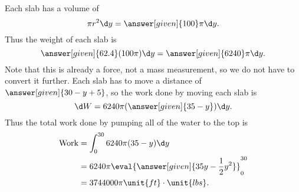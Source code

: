 \documentclass{ximera}
\begin{document}
\begin{example}
\begin{explanation}
\begin{image}
    \end{image}
    Each slab has a volume of
    \[
    \pi r^2 \d y = \answer[given]{100}\pi\d y.
    \]
    Thus the weight of each slab is
    \[
    \answer[given]{62.4}(100\pi)\d y = \answer[given]{6240}\pi \d y.
    \]
    Note that this is already a force, not a mass measurement, so we
    do not have to convert it further.  Each slab has to move a
    distance of $\answer[given]{30-y +5}$, so the work done by moving
    each slab is
    \[
    \d W = 6240 \pi (\answer[given]{35-y}) \d y.
    \]
    Thus the total work done by pumping all of the water to the top is
    \begin{align*}
      \mathrm{Work} &= \int_0^{30} 6240 \pi (35-y) \d y\\
      &= 6240 \pi \eval{\answer[given]{35y-\frac{1}{2}y^2}}_0^{30}\\
      &=  3744000 \pi \unit{ft}\cdot\unit{lbs}.
    \end{align*}
  \end{explanation}
\end{example}
\end{document}

